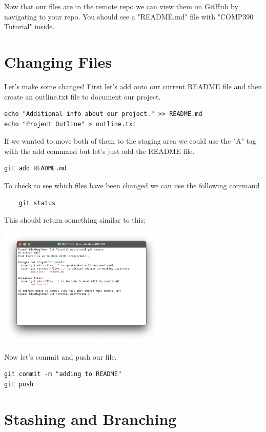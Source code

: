 \documentclass{article}
\begin{document}
Now that our files are in the remote repo we can view them on \href{https://github.com/}{GitHub} by navigating to your repo.
You should see a "README.md" file with "COMP390 Tutorial" inside.

\section{Changing Files}

Let's make some changes! First let's add onto our current README file and then create an outline.txt file to document our project.

\begin{verbatim}
echo "Additional info about our project." >> README.md
echo "Project Outline" > outline.txt
\end{verbatim}

If we wanted to move both of them to the staging area we could use the "A" tag with the add command but let's just add the README file.

\begin{verbatim}
git add README.md
\end{verbatim}

To check to see which files have been changed we can use the following command \begin{verbatim}
    git status
\end{verbatim}

This should return something similar to this:

\begin{center}
    \includegraphics[width=8cm]{shot2.png}
\end{center}

Now let's commit and push our file.
\begin{verbatim}
git commit -m "adding to README"
git push
\end{verbatim}

\section{Stashing and Branching}
\end{document}
